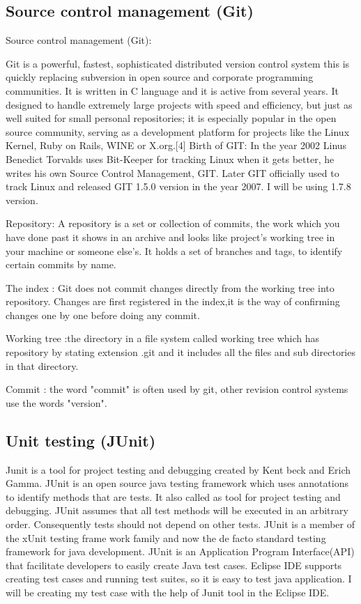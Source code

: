 \documentclass{article}
\begin{document}
\subsection{Source control management (Git)}
\label{sec:scm}

Source control management (Git):

Git is a powerful, fastest, sophisticated distributed version control system this is quickly replacing subversion in open source and corporate programming communities. It is written in C language and it is active from several years. It designed to handle extremely large projects with speed and efficiency,	but just as well suited for small personal repositories; it is especially popular in the open source community, serving as a development platform for projects like the Linux Kernel, Ruby on Rails, WINE or X.org.[4]
Birth of GIT:
In the year 2002 Linus Benedict Torvalds uses Bit-Keeper for tracking Linux when it gets better, he writes his own Source Control Management, GIT. Later GIT officially used to track Linux and released GIT 1.5.0 version in the year 2007.
I will be using 1.7.8 version.

Repository:  A repository is a set or collection of commits, the work which you have done past it shows in an archive and looks like project's working tree in your machine or someone else's. It holds a set of branches and tags, to identify certain commits by name.

The index : Git does not commit changes directly from the working tree into repository. Changes are first registered in the index,it is the way of confirming changes one by one before doing any commit.																										

Working tree :the directory in a file system called working tree which has repository by stating extension .git and it includes all the files and sub directories in that  directory.

Commit : the word "commit" is often used by git, other revision control systems use the words "version".


\subsection{Unit testing (JUnit)}
\label{sec:junit}

Junit is a tool for project testing and debugging created by Kent beck and Erich Gamma.
JUnit is an open source java testing framework which uses annotations to identify methods that are tests. It also called as tool for project testing and debugging. JUnit assumes that all test methods will be executed in an arbitrary order. Consequently tests should not depend on other tests.
JUnit is a member of the xUnit testing frame work family and now the de facto standard testing framework for java development. JUnit is an Application Program Interface(API) that facilitate developers to easily create Java test cases. 
Eclipse IDE supports creating test cases and running test suites, so it is easy to test java application.
I will be creating my test case with the help of Junit tool in the Eclipse IDE. 
\end{document}
